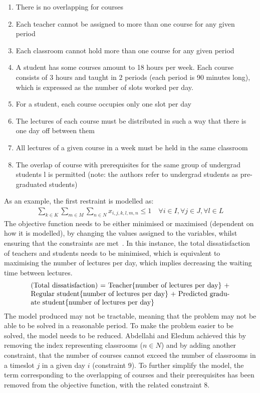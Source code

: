 \documentclass[a4paper, 12pt]{report}
\begin{document}
\begin{enumerate}
	\item There is no overlapping for courses
	\item Each teacher cannot be assigned to more than one course for any given
		period
	\item Each classroom cannot hold more than one course for any given period
	\item A student has some courses amount to 18 hours per week. Each course
		consists of 3 hours and taught in 2 periods (each period is 90 minutes
		long), which is expressed as the number of slots worked per day.
	\item For a student, each course occupies only one slot per day
	\item The lectures of each course must be distributed in such a way that
		there is one day off between them
	\item All lectures of a given course in a week must be held in the same
		classroom
	\item The overlap of course with prerequisites for the same group of
		undergrad students l is permitted (note: the authors refer to undergrad 
		students as pre-graduated students)
\end{enumerate}

As an example, the first restraint is modelled as:
\begin{align*}
	\sum_{k \in K} \sum_{m \in M} \sum_{n \in N} x_{i,j,k,l,m,n} \leq 1 \quad
	\forall i \in I, \forall j \in J, \forall l \in L
\end{align*}
The objective function needs to be either minimised or maximised (dependent on
how it is modelled), by changing the values assigned to the variables, whilst
ensuring that the constraints are met~\cite{objective_function}.
In this instance, the total dissatisfaction of teachers and students needs to be
minimised, which is equivalent to maximising the number of lectures per day,
which implies decreasing the waiting time between lectures.
\begin{align*}
	\parbox[t]{10cm}{(Total dissatisfaction) = Teacher\{number of lectures per
	day\} + Regular student\{number of lectures per day\} + Predicted graduate
	student\{number of lectures per day\}}
\end{align*}
The model produced may not be tractable, meaning that the problem may not be
able to be solved in a reasonable period.
To make the problem easier to be solved, the model needs to be reduced.
Abdellahi and Eledum achieved this by removing the index representing
classrooms (\( n\in N \)) and by adding another constraint, that the number of
courses cannot exceed the number of classrooms in a timeslot \( j \) in a given
day \( i \) (constraint 9).
To further simplify the model, the term corresponding to the overlapping of
courses and their prerequisites has been removed from the objective function,
with the related constraint 8.
\end{document}
